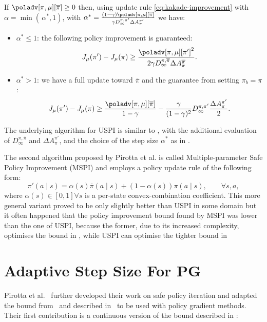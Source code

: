 \begin{theorem}
\label{th:pirotta-algo}
If $\poladv[\pi, \mu][\overline{\pi}] \geq 0$ then, using update rule \ref{eq:kakade-improvement} with $\alpha = \min(\, \alpha^*, 1)$, with $\alpha^* = \frac{(1-\gamma)\poladv[\pi, \mu][\overline{\pi}]}{\gamma D_\infty^{\pi, \pi'}\Delta A_\pi^{\pi'}}$ we have:
\begin{itemize}
\item $\alpha^* \leq 1$: the following policy improvement is guaranteed:
\[
J_\mu (\pi') - J_\mu (\pi) \geq \frac{{\poladv[\pi, \mu][\pi']}^2}{2\gamma D_\infty^{\pi, \overline{\pi}}\Delta A_\pi^{\overline{\pi}}}.
\]
\item $\alpha^* > 1$: we have a full update toward $\overline{\pi}$ and the guarantee from  setting $\pi_b = \pi$:
\begin{equation}
J_{\mu}(\pi') - J_\mu(\pi) \geq \frac{\poladv[\pi, \mu][\overline{\pi}]}{1-\gamma} - \frac{\gamma}{(1-\gamma)^2}{D_\infty^{\pi, \pi'}} \frac{\Delta A_{\pi}^{\pi'}}{2}.
\end{equation}
\end{itemize}
\end{theorem}

The underlying algorithm for USPI is similar to , with the additional evaluation of $D_\infty^{\pi, \overline{\pi}}$ and $\Delta A_\pi^{\pi'}$, and the choice of the step size $\alpha^*$ as in .

The second algorithm proposed by Pirotta et al. is called Multiple-parameter Safe Policy Improvement (MSPI) and employs a policy update rule of the following form:
\[
\pi'(a\mid s) = \alpha(s)\overline{\pi}(a\mid s) + (1-\alpha(s))\pi(a\mid s),\qquad\forall s,a,
\]
where $\alpha(s)\in [0,1] \forall s$ is a per-state convex-combination coefficient. This more general variant proved to be only slightly better than USPI in some domain but it often happened that the policy improvement bound found by MSPI was lower than the one of USPI, because the former, due to its increased complexity, optimises the bound in , while USPI can optimise the tighter bound in 

\section{Adaptive Step Size For PG}
\label{sec:ass}
Pirotta et al.~\cite{adaptive_step} further developed their work on safe policy iteration and adapted the bound from~\cite{safe_iteration} and described in~ to be used with policy gradient methods.\\
Their first contribution is a continuous version of the bound described in :

